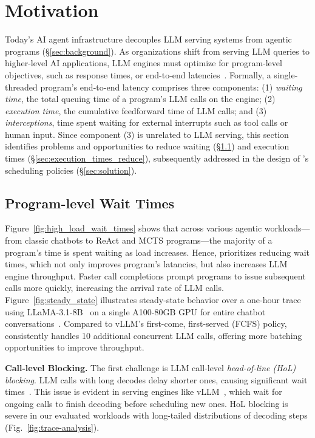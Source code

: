 
\section{Motivation}
\label{sec:motivation}
Today's AI agent infrastructure decouples LLM serving systems from agentic programs (\S\ref{sec:background}). As organizations shift from serving LLM queries to higher-level AI applications, LLM engines must optimize for program-level objectives, such as response times, or end-to-end latencies~\cite{lin2024parrotefficientservingllmbased}. Formally, a single-threaded program's end-to-end latency comprises three components: (1) \emph{waiting time}, the total queuing time of a program's LLM calls on the engine; (2) \emph{execution time}, the cumulative feedforward time of LLM calls; and (3) \emph{interceptions}, time spent waiting for external interrupts such as tool calls or human input. Since component (3) is unrelated to LLM serving, this section identifies problems and opportunities to reduce waiting (\S\ref{sec:wait_time_reduce}) and execution times (\S\ref{sec:execution_times_reduce}), subsequently addressed in the design of \text{\name}'s scheduling policies (\S\ref{sec:solution}).

\subsection{Program-level Wait Times}
\label{sec:wait_time_reduce}


Figure~\ref{fig:high_load_wait_times} shows that across various agentic workloads—from classic chatbots to ReAct and MCTS programs—the majority of a program's time is spent waiting as load increases. Hence, \text{\name} prioritizes reducing wait times, which not only improves program's latancies, but also increases LLM engine throughput. Faster call completions prompt programs to issue subsequent calls more quickly, increasing the arrival rate of LLM calls. Figure~\ref{fig:steady_state} illustrates steady-state behavior over a one-hour trace using LLaMA-3.1-8B~\cite{llama3} on a single A100-80GB GPU for entire chatbot conversations~\cite{sharegpt}. Compared to vLLM's first-come, first-served (FCFS) policy, \text{\name} consistently handles 10 additional concurrent LLM calls, offering more batching opportunities to improve throughput.

\vspace{2mm}
\noindent \textbf{Call-level Blocking.} The first challenge is LLM call-level \textit{head-of-line (HoL) blocking}. LLM calls with long decodes delay shorter ones, causing significant wait times~\cite{fastserve}. This issue is evident in serving engines like vLLM~\cite{vllm}, which wait for ongoing calls to finish decoding before scheduling new ones. HoL blocking is severe in our evaluated workloads with long-tailed distributions of decoding steps (Fig.~\ref{fig:trace-analysis}).

